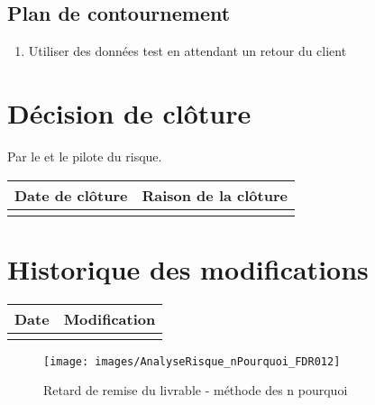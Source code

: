\flushleft
\subsection*{Plan de contournement}

\begin{enumerate}
	\item Utiliser des données test en attendant un retour du client
\end{enumerate}

\section*{Décision de clôture}
Par le \CP{} et le pilote du risque.
\begin{table}[H]
\centering
	\begin{tabularx}{16.8cm}{|X|X|}
	\hline
	\rowcolor{gray!40} Date de clôture & Raison de la clôture \\
	\hline
	  & \\
	\hline
	\end{tabularx}
\end{table}

\section*{Historique des modifications}
\begin{table}[H]
\centering
	\begin{tabularx}{16.8cm}{|X|X|}
	\hline
	\rowcolor{gray!40} Date & Modification \\
	\hline
	  & \\
	\hline
	\end{tabularx}
\end{table}
\newpage

\begin{figure}
	\centering
	\texttt{[image: images/AnalyseRisque\_nPourquoi\_FDR012]}
	\caption{\label{risque retard de remise du livrable} Retard de remise du livrable - méthode des n pourquoi}
\end{figure}
